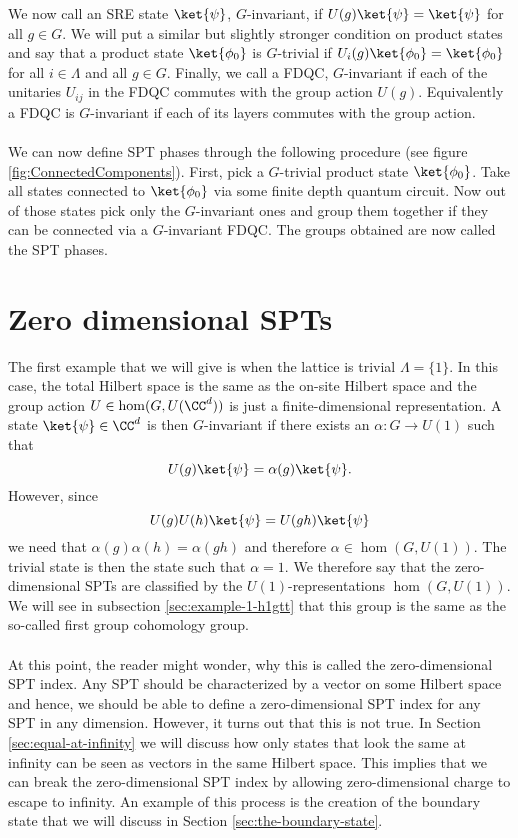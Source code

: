 We now call an SRE state $\ket{\psi}$, $G$-invariant, if $U(g)\ket{\psi}=\ket{\psi}$ for all $g\in G$. We will put a similar but slightly stronger condition on product states and say that a product state $\ket{\phi_0}$ is $G$-trivial if $U_i(g)\ket{\phi_0}=\ket{\phi_0}$ for all $i\in\Lambda$ and all $g\in G$. Finally, we call a FDQC, $G$-invariant if each of the unitaries $U_{ij}$ in the FDQC commutes with the group action $U(g)$. Equivalently a FDQC is $G$-invariant if each of its layers commutes with the group action.\\\\
We can now define SPT phases through the following procedure (see figure \ref{fig:ConnectedComponents}). First, pick a $G$-trivial product state $\ket{\phi_0}$. Take all states connected to $\ket{\phi_0}$ via some finite depth quantum circuit. Now out of those states pick only the $G$-invariant ones and group them together if they can be connected via a $G$-invariant FDQC. The groups obtained are now called the SPT phases.
\section{Zero dimensional SPTs}\label{sec:zero-dimensional-spts}The first example that we will give is when the lattice is trivial $\Lambda=\{1\}$. In this case, the total Hilbert space is the same as the on-site Hilbert space and the group action $U\in\hom(G,U(\CC^d))$ is just a finite-dimensional representation. A state $\ket{\psi}\in\CC^d$ is then $G$-invariant if there exists an $\alpha:G\rightarrow U(1)$ such that
\begin{equation}
U(g)\ket{\psi}=\alpha(g)\ket{\psi}.
\end{equation}
However, since
\begin{equation}
U(g)U(h)\ket{\psi}=U(gh)\ket{\psi}
\end{equation}
we need that $\alpha(g)\alpha(h)=\alpha(gh)$ and therefore $\alpha\in\hom(G,U(1))$. The trivial state is then the state such that $\alpha=1$. We therefore say that the zero-dimensional SPTs are classified by the $U(1)$-representations $\hom(G,U(1))$. We will see in subsection \ref{sec:example-1-h1gtt} that this group is the same as the so-called first group cohomology group.
\\\\
At this point, the reader might wonder, why this is called the zero-dimensional SPT index. Any SPT should be characterized by a vector on some Hilbert space and hence, we should be able to define a zero-dimensional SPT index for any SPT in any dimension. However, it turns out that this is not true. In Section \ref{sec:equal-at-infinity} we will discuss how only states that look the same at infinity can be seen as vectors in the same Hilbert space. This implies that we can break the zero-dimensional SPT index by allowing zero-dimensional charge to escape to infinity. An example of this process is the creation of the boundary state that we will discuss in Section \ref{sec:the-boundary-state}.
